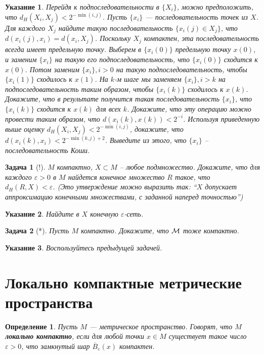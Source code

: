 \documentclass[12pt]{book}
\newcommand{\subs}{\section}
\renewcommand{\epsilon}{\varepsilon}
\theoremstyle{upshape}
\newtheorem{zadacha}{Задача}[chapter]
\theoremstyle{generic}
\newtheorem{opredelenie}[teorema]{Определение}
\theoremstyle{upshapenonumber}
\newtheorem{ukazanie}{Указание}[section]
\newcommand{\следствие}{%
     \refstepcounter{teorema}
     {\noindent\bf Следствие \thechapter.\arabic{teorema}:\ }}
\newcommand{\пример}{%
     \refstepcounter{teorema}
     {\noindent\bf Пример \thechapter.\arabic{teorema}:\ }}
\newcommand{\лемма}{%
     \refstepcounter{teorema}
     {\noindent\bf Лемма \thechapter.\arabic{teorema}:\ }}
\newcommand{\теорема}{%
     \refstepcounter{teorema}
     {\noindent\bf Теорема \thechapter.\arabic{teorema}:\ }}
\newcommand{\утверждение}{%
     \refstepcounter{teorema}
     {\noindent\bf Утверждение \thechapter.\arabic{teorema}:\ }}
\begin{document}
{\begin{ukazanie} Перейдя к подпоследовательности в $\{X_i\}$,
можно предположить, что $d_H(X_i, X_j)< 2^{-\min(i,j)}$.  Пусть
$\{x_i\}$ --- последовательность точек из $X$. Для каждого $X_j$
найдите такую последовательность $\{x_i(j)\in X_j\}$, что $d(x_i(j),
x_i)= d(x_i, X_j)$. Поскольку $X_j$ компактен, эта
последовательность всегда имеет предельную точку.  Выберем в
$\{x_i(0)\}$ предельную точку $x(0)$, и заменим $\{x_i\}$ на такую
его подпоследовательность, что $\{x_i(0)\}$ сходится к $x(0)$.
Потом заменим $\{x_i\}, i>0$ на такую подпоследовательность, чтобы
$\{x_i(1)\}$ сходилось к $x(1)$. На $k$-м шаге мы заменяем $\{x_i\},
i>k$ на подпоследовательность таким образом, чтобы $\{x_i(k)\}$
сходилось к $x(k)$. Докажите, что в результате получится такая
последовательность $\{x_i\}$, что $\{x_i(k)\}$ сходится к $x(k)$ для
всех $k$. Докажите, что эту операцию можно провести таким образом,
что $d(x_i(k), x(k)) < 2^{-i}$. Используя приведенную выше оценку
$d_H(X_i, X_j)< 2^{-\min(i,j)}$, докажите, что $d(x_i(k), x_i)<
2^{-\min(k,j)+2}$. Выведите из этого, что $\{x_i\}$ --
последовательность Коши.
\end{ukazanie}

\begin{zadacha}[!] $M$ компактно, $X\subset M$ --
любое подмножество. Докажите, что для каждого $\epsilon >0$ в $M$
найдется конечное множество $R$ такое, что $d_H(R, X)<\epsilon$.
(Это утверждение можно выразить так: ``$X$ допускает аппроксимацию
конечными множествами, с заданной наперед точностью'')
\end{zadacha}

\begin{ukazanie} Найдите в $X$ конечную $\epsilon$-сеть.
\end{ukazanie}

\begin{zadacha}[*] Пусть $M$ компактно. Докажите, что 
$\cal M$ тоже компактно.
\end{zadacha}

\begin{ukazanie} Воспользуйтесь предыдущей задачей.
\end{ukazanie}



\subs{Локально компактные метрические пространства}


\begin{opredelenie} Пусть $M$ --- метрическое пространство.
Говорят, что $M$ {\bf локально компактно}, если для любой точки
$x\in M$ существует такое число $\epsilon>0$, что замкнутый шар
$\overline{B}_\epsilon(x)$ компактен.
\end{opredelenie}


}
\end{document}
